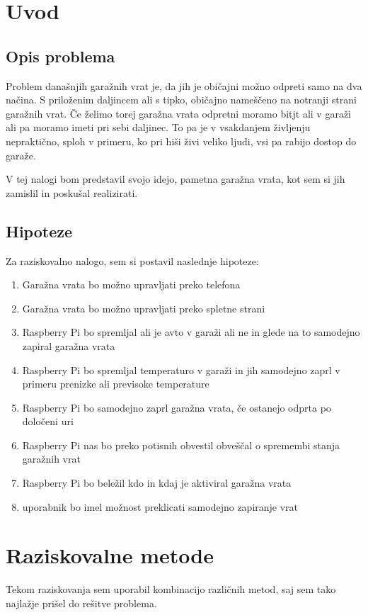 \documentclass[11pt]{article}
\begin{document}

\newpage
{}
\setcounter{page}{6}
\section{Uvod}
\subsection{Opis problema}
Problem današnjih garažnih vrat je, da jih je običajni možno odpreti samo na dva načina. S priloženim daljincem ali s tipko, običajno nameščeno na notranji strani garažnih vrat. Če želimo torej garažna vrata odpretni moramo bitjt ali v garaži ali pa moramo imeti pri sebi daljinec. To pa je v vsakdanjem življenju nepraktično, sploh v primeru, ko pri hiši živi veliko ljudi, vsi pa rabijo dostop do garaže.

V tej nalogi bom predstavil svojo idejo, pametna garažna vrata, kot sem si jih zamislil in poskušal realizirati.

\subsection{Hipoteze}
Za raziskovalno nalogo, sem si postavil naslednje hipoteze:
\begin{enumerate}
    \item Garažna vrata bo možno upravljati preko telefona
    \item Garažna vrata bo možno upravljati preko spletne strani
    \item Raspberry Pi bo spremljal ali je avto v garaži ali ne in glede na to samodejno zapiral garažna vrata
    \item Raspberry Pi bo spremljal temperaturo v garaži in jih samodejno zaprl v primeru prenizke ali previsoke temperature
    \item Raspberry Pi bo samodejno zaprl garažna vrata, če ostanejo odprta po določeni uri
    \item Raspberry Pi nas bo preko potisnih obvestil obveščal o spremembi stanja garažnih vrat
    \item Raspberry Pi bo beležil kdo in kdaj je aktiviral garažna vrata
    \item uporabnik bo imel možnost preklicati samodejno zapiranje vrat
\end{enumerate}

\section{Raziskovalne metode}
Tekom raziskovanja sem uporabil kombinacijo različnih metod, saj sem tako najlažje prišel do rešitve problema.
\end{document}
